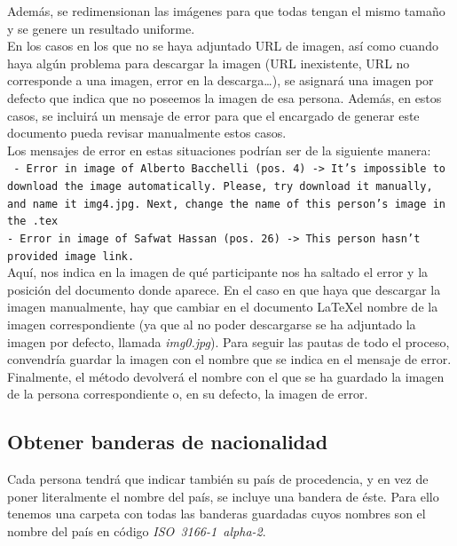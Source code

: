 \documentclass[a4paper, 12pt]{book}
\begin{document}
Además, se redimensionan las imágenes para que todas tengan el mismo tamaño y se genere un resultado uniforme.\\

En los casos en los que no se haya adjuntado URL de imagen, así como cuando haya algún problema para descargar la imagen (URL inexistente, URL no corresponde a una imagen, error en la descarga\ldots), se asignará una imagen por defecto que indica que no poseemos la imagen de esa persona. Además, en estos casos, se incluirá un mensaje de error para que el encargado de generar este documento pueda revisar manualmente estos casos.\\

Los mensajes de error en estas situaciones podrían ser de la siguiente manera:\\
\texttt{
- Error in image of Alberto Bacchelli (pos. 4) -> It's impossible to download the image automatically. Please, try download it manually, and name it img4.jpg. Next, change the name of this person's image in the .tex\\
- Error in image of Safwat Hassan (pos. 26) -> This person hasn't provided image link.
}\\

Aquí, nos indica en la imagen de qué participante nos ha saltado el error y la posición del documento donde aparece. En el caso en que haya que descargar la imagen manualmente, hay que cambiar en el documento \LaTeX el nombre de la imagen correspondiente (ya que al no poder descargarse se ha adjuntado la imagen por defecto, llamada \textit{img0.jpg}). Para seguir las pautas de todo el proceso, convendría guardar la imagen con el nombre que se indica en el mensaje de error.\\

Finalmente, el método devolverá el nombre con el que se ha guardado la imagen de la persona correspondiente o, en su defecto, la imagen de error.


\subsection{Obtener banderas de nacionalidad}
\label{subsec:banderas}
Cada persona tendrá que indicar también su país de procedencia, y en vez de poner literalmente el nombre del país, se incluye una bandera de éste. Para ello tenemos una carpeta con todas las banderas guardadas cuyos nombres son el nombre del país en código \mbox{\textit{ISO 3166-1 alpha-2}}.\\
\end{document}
